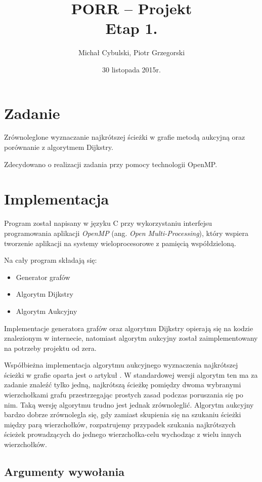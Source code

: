 \documentclass {article}
\author {Michał Cybulski, Piotr Grzegorski}
\title {PORR -- Projekt\\Etap 1.}
\date {30 listopada 2015r.}
\begin{document}
\maketitle

\section {Zadanie}

Zrównoleglone wyznaczanie najkrótszej ścieżki w grafie metodą aukcyjną oraz porównanie z algorytmem Dijkstry.

Zdecydowano o realizacji zadania przy pomocy technologii OpenMP.

\section{Implementacja}

Program został napisany w języku C przy wykorzystaniu interfejsu programowania aplikacji \emph{OpenMP} (ang. \emph{Open Multi-Processing}), który wspiera tworzenie aplikacji na systemy wieloprocesorowe z pamięcią współdzieloną.

Na cały program składają się:
\begin{itemize}
    \item Generator grafów
    \item Algorytm Dijkstry
    \item Algorytm Aukcyjny
\end{itemize}

Implementacje generatora grafów oraz algorytmu Dijkstry opierają się na kodzie znalezionym w internecie, natomiast algorytm aukcyjny został zaimplementowany na potrzeby projektu od zera. 

Współbieżna implementacja algorytmu aukcyjnego wyznaczenia najkrótszej ścieżki w grafie oparta jest o artykuł \cite{Bertsekas1991}. W standardowej wersji algorytm ten ma za zadanie znaleźć tylko jedną, najkrótszą ścieżkę pomiędzy dwoma wybranymi wierzchołkami grafu przestrzegając prostych zasad podczas poruszania się po nim. Taką wersję algorytmu trudno jest jednak zrównoleglić. Algorytm aukcyjny bardzo dobrze zrównolegla się, gdy zamiast skupienia się na szukaniu ścieżki między parą wierzchołków, rozpatrujemy przypadek szukania najkrótszych ścieżek prowadzących do jednego wierzchołka-celu wychodząc z wielu innych wierzchołków.

\subsection{Argumenty wywołania}
\end{document}
